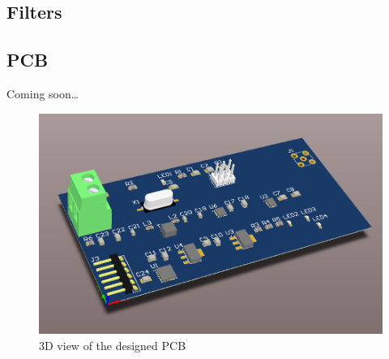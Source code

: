 \documentclass[a4paper, openany, oneside]{memoir}
\begin{document}
\subsection{Filters}




\subsection{PCB}
Coming soon\ldots

\begin{figure}[h]
    \centering
    \includegraphics[width=\textwidth]{pcb.png}
    \caption{3D view of the designed PCB}
    \label{fig:pcb_3d}
\end{figure}
\end{document}

